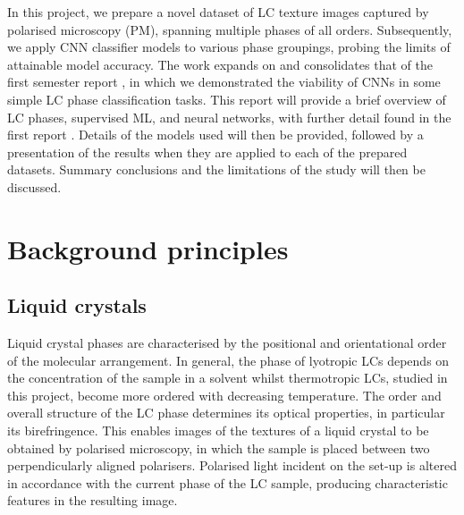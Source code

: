 \documentclass[12pt]{article}
\begin{document}
In this project, we prepare a novel dataset of LC texture images captured by polarised microscopy (PM), spanning multiple phases of all orders. Subsequently, we apply CNN classifier models to various phase groupings, probing the limits of attainable model accuracy. The work expands on and consolidates that of the first semester report \cite{Heaton20}, in which we demonstrated the viability of CNNs in some simple LC phase classification tasks. This report will provide a brief overview of LC phases, supervised ML, and neural networks, with further detail found in the first report \cite{Heaton20}. Details of the models used will then be provided, followed by a presentation of the results when they are applied to each of the prepared datasets. Summary conclusions and the limitations of the study will then be discussed.
\section{Background principles}

\subsection{Liquid crystals}
Liquid crystal phases are characterised by the positional and orientational order of the molecular arrangement. In general, the phase of lyotropic LCs depends on the concentration of the sample in a solvent whilst thermotropic LCs, studied in this project, become more ordered with decreasing temperature. The order and overall structure of the LC phase determines its optical properties, in particular its birefringence. This enables images of the textures of a liquid crystal to be obtained by polarised microscopy, in which the sample is placed between two perpendicularly aligned polarisers. Polarised light incident on the set-up is altered in accordance with the current phase of the LC sample, producing characteristic features in the resulting image.
\end{document}
